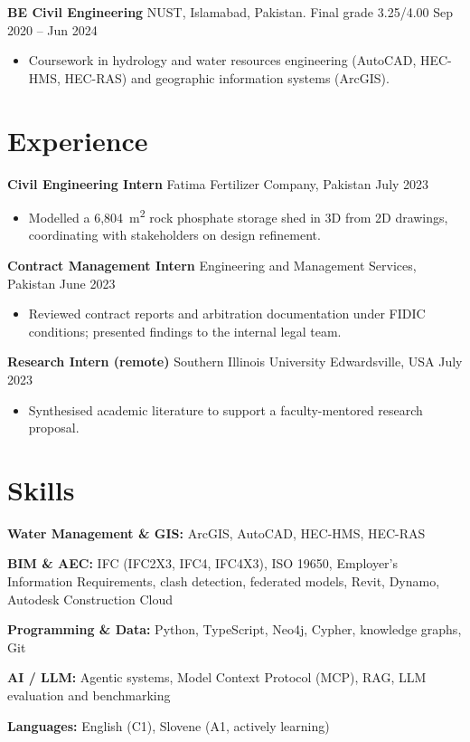 \documentclass[a4paper,10.5pt]{article}
\newcommand{\datefill}{\dotfill}
\newcommand{\entry}[3]{\vspace{2.5pt}\noindent\textbf{#1} \textbar{} #2 \datefill{} #3\par\vspace{0.5pt}}
\newcommand{\skillrow}[2]{\noindent\textbf{#1:} #2\par\vspace{1pt}}
\begin{document}
\entry{BE Civil Engineering}{NUST, Islamabad, Pakistan. Final grade 3.25/4.00}{Sep 2020 -- Jun 2024}
\begin{itemize}
  \item Coursework in hydrology and water resources engineering (AutoCAD, HEC-HMS,
        HEC-RAS) and geographic information systems (ArcGIS).
\end{itemize}

\section{Experience}
\entry{Civil Engineering Intern}{Fatima Fertilizer Company, Pakistan}{July 2023}
\begin{itemize}
  \item Modelled a 6,804~m\textsuperscript{2} rock phosphate storage shed in 3D from
        2D drawings, coordinating with stakeholders on design refinement.
\end{itemize}

\entry{Contract Management Intern}{Engineering and Management Services, Pakistan}{June 2023}
\begin{itemize}
  \item Reviewed contract reports and arbitration documentation under FIDIC
        conditions; presented findings to the internal legal team.
\end{itemize}

\entry{Research Intern (remote)}{Southern Illinois University Edwardsville, USA}{July 2023}
\begin{itemize}
  \item Synthesised academic literature to support a faculty-mentored research proposal.
\end{itemize}

\section{Skills}

\skillrow{Water Management \& GIS}{ArcGIS, AutoCAD, HEC-HMS, HEC-RAS}
\skillrow{BIM \& AEC}{IFC (IFC2X3, IFC4, IFC4X3), ISO 19650, Employer's Information Requirements, clash detection, federated models, Revit, Dynamo, Autodesk Construction Cloud}
\skillrow{Programming \& Data}{Python, TypeScript, Neo4j, Cypher, knowledge graphs, Git}
\skillrow{AI / LLM}{Agentic systems, Model Context Protocol (MCP), RAG, LLM evaluation and benchmarking}

\skillrow{Languages}{English (C1), Slovene (A1, actively learning)}
\end{document}
